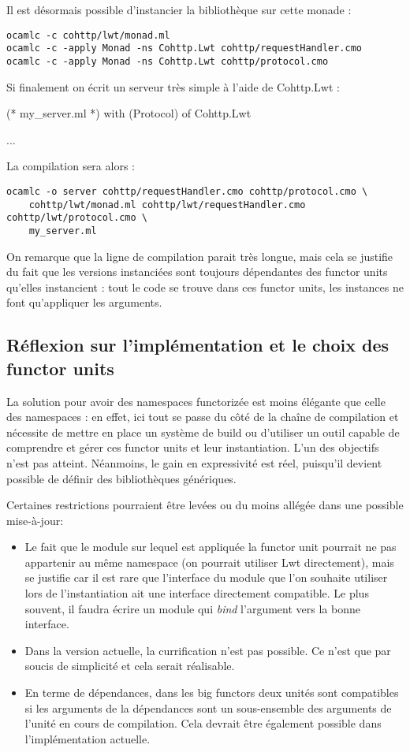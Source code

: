 \documentclass[11pt,a4paper]{report}
\begin{document}
Il est désormais possible d'instancier la bibliothèque sur cette monade :

\begin{verbatim}
ocamlc -c cohttp/lwt/monad.ml
ocamlc -c -apply Monad -ns Cohttp.Lwt cohttp/requestHandler.cmo
ocamlc -c -apply Monad -ns Cohttp.Lwt cohttp/protocol.cmo
\end{verbatim}

Si finalement on écrit un serveur très simple à l'aide de Cohttp.Lwt :
\begin{OCaml}
(* my_server.ml *)
with (Protocol) of Cohttp.Lwt

...
\end{OCaml}

La compilation sera alors :

\begin{verbatim}
ocamlc -o server cohttp/requestHandler.cmo cohttp/protocol.cmo \
    cohttp/lwt/monad.ml cohttp/lwt/requestHandler.cmo cohttp/lwt/protocol.cmo \
    my_server.ml 
\end{verbatim}

On remarque que la ligne de compilation parait très longue, mais cela se
justifie du fait que les versions instanciées sont toujours dépendantes des
functor units qu'elles instancient : tout le code se trouve dans ces functor
units, les instances ne font qu'appliquer les arguments.

\subsection{Réflexion sur l'implémentation et le choix des functor units}

La solution pour avoir des namespaces functorizée est moins élégante que celle
des namespaces : en effet, ici tout se passe du côté de la chaîne de compilation
et nécessite de mettre en place un système de build ou d'utiliser un outil
capable de comprendre et gérer ces functor units et leur instantiation. L'un des
objectifs n'est pas atteint. Néanmoins, le gain en expressivité est réel,
puisqu'il devient possible de définir des bibliothèques génériques.

Certaines restrictions pourraient être levées ou du moins allégée dans une
possible mise-à-jour:
\begin{itemize}
\item Le fait que le module sur lequel est appliquée la functor unit pourrait ne
  pas appartenir au même namespace (on pourrait utiliser Lwt directement), mais
  se justifie car il est rare que l'interface du module que l'on souhaite
  utiliser lors de l'instantiation ait une interface directement compatible. Le
  plus souvent, il faudra écrire un module qui \emph{bind} l'argument vers la
  bonne interface.
\item Dans la version actuelle, la currification n'est pas possible. Ce n'est
  que par soucis de simplicité et cela serait réalisable.
\item En terme de dépendances, dans les big functors deux unités sont
  compatibles si les arguments de la dépendances sont un sous-ensemble des
  arguments de l'unité en cours de compilation. Cela devrait être également
  possible dans l'implémentation actuelle.
\end{itemize}
\end{document}
